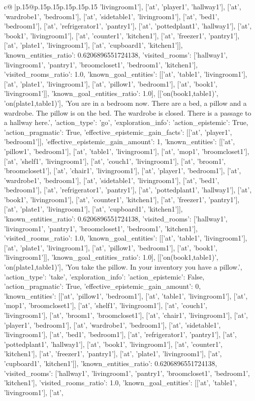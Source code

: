 \documentclass{article}
\begin{document}
{\begin{supertabular}{c@{$\;$}|p{.15\linewidth}@{}p{.15\linewidth}p{.15\linewidth}p{.15\linewidth}p{.15\linewidth}p{.15\linewidth}}
{{{'livingroom1'], ['at', 'player1', 'hallway1'], ['at', 'wardrobe1', 'bedroom1'], ['at', 'sidetable1', 'livingroom1'], ['at', 'bed1', 'bedroom1'], ['at', 'refrigerator1', 'pantry1'], ['at', 'pottedplant1', 'hallway1'], ['at', 'book1', 'livingroom1'], ['at', 'counter1', 'kitchen1'], ['at', 'freezer1', 'pantry1'], ['at', 'plate1', 'livingroom1'], ['at', 'cupboard1', 'kitchen1']], 'known_entities_ratio': 0.6206896551724138, 'visited_rooms': ['hallway1', 'livingroom1', 'pantry1', 'broomcloset1', 'bedroom1', 'kitchen1'], 'visited_rooms_ratio': 1.0, 'known_goal_entities': [['at', 'table1', 'livingroom1'], ['at', 'plate1', 'livingroom1'], ['at', 'pillow1', 'bedroom1'], ['at', 'book1', 'livingroom1']], 'known_goal_entities_ratio': 1.0}}], [['on(book1,table1)', 'on(plate1,table1)'], 'You are in a bedroom now. There are a bed, a pillow and a wardrobe. The pillow is on the bed. The wardrobe is closed. There is a passage to a hallway here.', {'action_type': 'go', 'exploration_info': {'action_epistemic': True, 'action_pragmatic': True, 'effective_epistemic_gain_facts': [['at', 'player1', 'bedroom1']], 'effective_epistemic_gain_amount': 1, 'known_entities': [['at', 'pillow1', 'bedroom1'], ['at', 'table1', 'livingroom1'], ['at', 'mop1', 'broomcloset1'], ['at', 'shelf1', 'livingroom1'], ['at', 'couch1', 'livingroom1'], ['at', 'broom1', 'broomcloset1'], ['at', 'chair1', 'livingroom1'], ['at', 'player1', 'bedroom1'], ['at', 'wardrobe1', 'bedroom1'], ['at', 'sidetable1', 'livingroom1'], ['at', 'bed1', 'bedroom1'], ['at', 'refrigerator1', 'pantry1'], ['at', 'pottedplant1', 'hallway1'], ['at', 'book1', 'livingroom1'], ['at', 'counter1', 'kitchen1'], ['at', 'freezer1', 'pantry1'], ['at', 'plate1', 'livingroom1'], ['at', 'cupboard1', 'kitchen1']], 'known_entities_ratio': 0.6206896551724138, 'visited_rooms': ['hallway1', 'livingroom1', 'pantry1', 'broomcloset1', 'bedroom1', 'kitchen1'], 'visited_rooms_ratio': 1.0, 'known_goal_entities': [['at', 'table1', 'livingroom1'], ['at', 'plate1', 'livingroom1'], ['at', 'pillow1', 'bedroom1'], ['at', 'book1', 'livingroom1']], 'known_goal_entities_ratio': 1.0}}], [['on(book1,table1)', 'on(plate1,table1)'], 'You take the pillow. In your inventory you have a pillow.', {'action_type': 'take', 'exploration_info': {'action_epistemic': False, 'action_pragmatic': True, 'effective_epistemic_gain_amount': 0, 'known_entities': [['at', 'pillow1', 'bedroom1'], ['at', 'table1', 'livingroom1'], ['at', 'mop1', 'broomcloset1'], ['at', 'shelf1', 'livingroom1'], ['at', 'couch1', 'livingroom1'], ['at', 'broom1', 'broomcloset1'], ['at', 'chair1', 'livingroom1'], ['at', 'player1', 'bedroom1'], ['at', 'wardrobe1', 'bedroom1'], ['at', 'sidetable1', 'livingroom1'], ['at', 'bed1', 'bedroom1'], ['at', 'refrigerator1', 'pantry1'], ['at', 'pottedplant1', 'hallway1'], ['at', 'book1', 'livingroom1'], ['at', 'counter1', 'kitchen1'], ['at', 'freezer1', 'pantry1'], ['at', 'plate1', 'livingroom1'], ['at', 'cupboard1', 'kitchen1']], 'known_entities_ratio': 0.6206896551724138, 'visited_rooms': ['hallway1', 'livingroom1', 'pantry1', 'broomcloset1', 'bedroom1', 'kitchen1'], 'visited_rooms_ratio': 1.0, 'known_goal_entities': [['at', 'table1', 'livingroom1'], ['at', }}}
\end{supertabular}}
\end{document}
